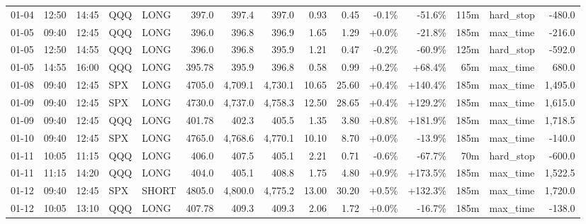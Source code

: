 \documentclass[11pt,a4paper,twoside]{article}
\begin{document}
\begin{landscape}
\begin{center}
\begin{longtable}{>{\color{txtmain}}l l l l l r r r r r r r r >{\color{txtmain}}l r}
01-04 & 12:50 & 14:45 & QQQ & LONG & 397.0 & 397.4 & 397.0 & 0.93 & 0.45 & \textcolor{lossred}{-0.1\%} & \textcolor{lossred}{-51.6\%} & 115m & hard\_stop & \textcolor{lossred}{-480.0} \\
01-05 & 09:40 & 12:45 & QQQ & LONG & 396.0 & 396.8 & 396.9 & 1.65 & 1.29 & \textcolor{wingreen}{+0.0\%} & \textcolor{lossred}{-21.8\%} & 185m & max\_time & \textcolor{lossred}{-216.0} \\
01-05 & 12:50 & 14:55 & QQQ & LONG & 396.0 & 396.8 & 395.9 & 1.21 & 0.47 & \textcolor{lossred}{-0.2\%} & \textcolor{lossred}{-60.9\%} & 125m & hard\_stop & \textcolor{lossred}{-592.0} \\
01-05 & 14:55 & 16:00 & QQQ & LONG & 395.78 & 395.9 & 396.8 & 0.58 & 0.99 & \textcolor{wingreen}{+0.2\%} & \textcolor{wingreen}{+68.4\%} & 65m & max\_time & \textcolor{wingreen}{680.0} \\
01-08 & 09:40 & 12:45 & SPX & LONG & 4705.0 & 4,709.1 & 4,730.1 & 10.65 & 25.60 & \textcolor{wingreen}{+0.4\%} & \textcolor{wingreen}{+140.4\%} & 185m & max\_time & \textcolor{wingreen}{1,495.0} \\
01-09 & 09:40 & 12:45 & SPX & LONG & 4730.0 & 4,737.0 & 4,758.3 & 12.50 & 28.65 & \textcolor{wingreen}{+0.4\%} & \textcolor{wingreen}{+129.2\%} & 185m & max\_time & \textcolor{wingreen}{1,615.0} \\
01-09 & 09:40 & 12:45 & QQQ & LONG & 401.78 & 402.3 & 405.5 & 1.35 & 3.80 & \textcolor{wingreen}{+0.8\%} & \textcolor{wingreen}{+181.9\%} & 185m & max\_time & \textcolor{wingreen}{1,718.5} \\
01-10 & 09:40 & 12:45 & SPX & LONG & 4765.0 & 4,768.6 & 4,770.1 & 10.10 & 8.70 & \textcolor{wingreen}{+0.0\%} & \textcolor{lossred}{-13.9\%} & 185m & max\_time & \textcolor{lossred}{-140.0} \\
01-11 & 10:05 & 11:15 & QQQ & LONG & 406.0 & 407.5 & 405.1 & 2.21 & 0.71 & \textcolor{lossred}{-0.6\%} & \textcolor{lossred}{-67.7\%} & 70m & hard\_stop & \textcolor{lossred}{-600.0} \\
01-11 & 11:15 & 14:20 & QQQ & LONG & 404.0 & 405.1 & 408.8 & 1.75 & 4.80 & \textcolor{wingreen}{+0.9\%} & \textcolor{wingreen}{+173.5\%} & 185m & max\_time & \textcolor{wingreen}{1,522.5} \\
01-12 & 09:40 & 12:45 & SPX & SHORT & 4805.0 & 4,800.0 & 4,775.2 & 13.00 & 30.20 & \textcolor{wingreen}{+0.5\%} & \textcolor{wingreen}{+132.3\%} & 185m & max\_time & \textcolor{wingreen}{1,720.0} \\
01-12 & 10:05 & 13:10 & QQQ & LONG & 407.78 & 409.3 & 409.3 & 2.06 & 1.72 & \textcolor{wingreen}{+0.0\%} & \textcolor{lossred}{-16.7\%} & 185m & max\_time & \textcolor{lossred}{-138.0} \\

\end{longtable}
\end{center}
\end{landscape}
\end{document}
